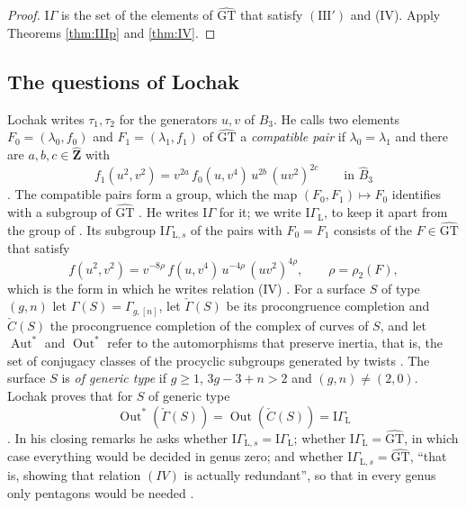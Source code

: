\documentclass[11pt,a4paper]{article}
\theoremstyle{plain}
\theoremstyle{definition}
\theoremstyle{remark}
\newcommand{\GT}{\widehat{\mathrm{GT}}}
\newcommand{\Zh}{\widehat{\mathbf Z}}
\newcommand{\Bh}{\widehat B}
\newcommand{\Aut}{\operatorname{Aut}}
\newcommand{\Out}{\operatorname{Out}}
\begin{document}
\begin{proof}
$\mathrm{I}\Gamma$ is the set of the elements of $\GT$ that satisfy $(\mathrm{III}')$ and (IV). Apply Theorems
\ref{thm:IIIp} and \ref{thm:IV}.
\end{proof}

\subsection*{The questions of Lochak}
Lochak \cite{Lo} writes $\tau_1,\tau_2$ for the generators $u,v$ of $B_3$. He calls two elements
$F_0=(\lambda_0,f_0)$ and $F_1=(\lambda_1,f_1)$ of $\GT$ a \emph{compatible pair} if $\lambda_0=\lambda_1$ and there
are $a,b,c\in\Zh$ with
\begin{equation}\label{eq:pair}
 f_1(u^2,v^2)=v^{2a}\,f_0(u,v^4)\,u^{2b}\,(uv^2)^{2c}\qquad\text{in }\Bh_3
\end{equation}
\cite[Definition 5.4]{Lo}. The compatible pairs form a group, which the map $(F_0,F_1)\mapsto F_0$ identifies with
a subgroup of $\GT$ \cite[Proposition--Definition 5.6]{Lo}. He writes $\mathrm{I}\Gamma$ for it; we write
$\mathrm{I}\Gamma_{\mathrm L}$, to keep it apart from the group of \cite{NS}. Its subgroup
$\mathrm{I}\Gamma_{\mathrm L,s}$ of the pairs with $F_0=F_1$ consists of the $F\in\GT$ that satisfy
\begin{equation}\label{eq:IVL}
 f(u^2,v^2)=v^{-8\rho}\,f(u,v^4)\,u^{-4\rho}\,(uv^2)^{4\rho},\qquad\rho=\rho_2(F),
\end{equation}
which is the form in which he writes relation (IV) \cite[pp.~58 and 60]{Lo}. For a surface $S$ of type $(g,n)$ let
$\Gamma(S)=\Gamma_{g,[n]}$, let $\check\Gamma(S)$ be its procongruence completion and $\check C(S)$ the
procongruence completion of the complex of curves of $S$, and let $\Aut^*$ and $\Out^*$ refer to the automorphisms
that preserve inertia, that is, the set of conjugacy classes of the procyclic subgroups generated by twists
\cite[pp.~2 and 6]{Lo}. The surface $S$ is \emph{of generic type} if $g\ge1$, $3g-3+n>2$ and $(g,n)\ne(2,0)$.
Lochak proves that for $S$ of generic type
\begin{equation}\label{eq:Lochak510}
 \Out^*(\check\Gamma(S))=\Out(\check C(S))=\mathrm{I}\Gamma_{\mathrm L}
\end{equation}
\cite[Theorem 5.10\,ii)]{Lo}. In his closing remarks he asks whether
$\mathrm{I}\Gamma_{\mathrm L,s}=\mathrm{I}\Gamma_{\mathrm L}$; whether $\mathrm{I}\Gamma_{\mathrm L}=\GT$, in which
case everything would be decided in genus zero; and whether $\mathrm{I}\Gamma_{\mathrm L,s}=\GT$, ``that is, showing
that relation $(IV)$ is actually redundant'', so that in every genus only pentagons would be needed
\cite[p.~62]{Lo}.
\end{document}
